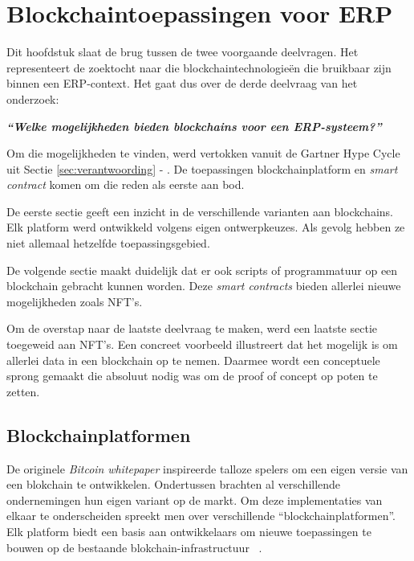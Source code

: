 \chapter{Blockchaintoepassingen voor ERP}
\label{ch:blockchaintoepassingen-voor-erp}

Dit hoofdstuk slaat de brug tussen de twee voorgaande deelvragen. Het representeert de zoektocht naar die blockchaintechnologieën die bruikbaar zijn binnen een ERP-context. Het gaat dus over de derde deelvraag van het onderzoek:

\begin{center}
	\textit{\textbf{``Welke mogelijkheden bieden blockchains voor een ERP-systeem?''}}
\end{center}

Om die mogelijkheden te vinden, werd vertokken vanuit de Gartner Hype Cycle uit Sectie \ref{sec:verantwoording} - . De toepassingen blockchainplatform en \textit{smart contract} komen om die reden als eerste aan bod.

De eerste sectie geeft een inzicht in de verschillende varianten aan blockchains. Elk platform werd ontwikkeld volgens eigen ontwerpkeuzes. Als gevolg hebben ze niet allemaal hetzelfde toepassingsgebied.

De volgende sectie maakt duidelijk dat er ook scripts of programmatuur op een blockchain gebracht kunnen worden. Deze \textit{smart contracts} bieden allerlei nieuwe mogelijkheden zoals NFT's. 

Om de overstap naar de laatste deelvraag te maken, werd een laatste sectie toegeweid aan NFT's. Een concreet voorbeeld illustreert dat het mogelijk is om allerlei data in een blockchain op te nemen. Daarmee wordt een conceptuele sprong gemaakt die absoluut nodig was om de proof of concept op poten te zetten.

\section{Blockchainplatformen}
\label{sec:blockchainplatformen}

De originele \textit{Bitcoin} \textit{whitepaper} inspireerde talloze spelers om een eigen versie van een blokchain te ontwikkelen. Ondertussen brachten al verschillende ondernemingen hun eigen variant op de markt. Om deze implementaties van elkaar te onderscheiden spreekt men over verschillende ``blockchainplatformen''. Elk platform biedt een basis aan ontwikkelaars om nieuwe toepassingen te bouwen op de bestaande blokchain-infrastructuur
~\autocite{Saraf2018}.

